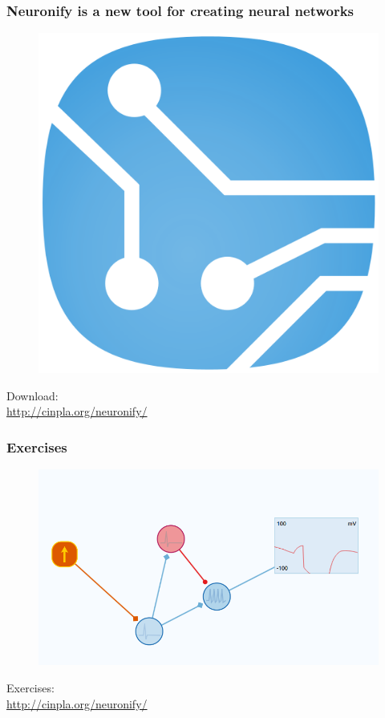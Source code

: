 \documentclass{beamer}
\begin{document}
\begin{frame}
\frametitle{Neuronify is a new tool for creating neural networks}


\begin{figure}
\includegraphics[height = 0.6\textheight]{figures/logo.png}
\end{figure}

\begin{alert}{Download:}\\
  \scriptsize
  \href{http://cinpla.org/neuronify/}{http://cinpla.org/neuronify/}
\end{alert}
\end{frame}


\begin{frame}
\frametitle{Exercises}


\begin{figure}
\includegraphics[width = \textwidth]{figures/exercises.png}
\end{figure}
\begin{alert}{Exercises:}\\
  \scriptsize
  \href{http://cinpla.org/neuronify/}{http://cinpla.org/neuronify/}\\
\end{alert}
\end{frame}
\end{document}
